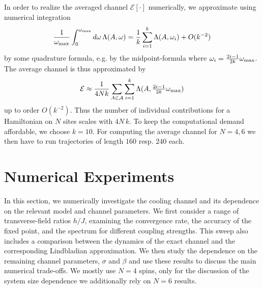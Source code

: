 \documentclass[12pt,a4paper]{article}
\begin{document}
In order to realize the averaged channel $\mathcal{E}[\cdot]$ numerically, we approximate using numerical integration
\begin{align}\label{eq:avg_channel_quadrature} \frac{1}{\omega_{\rm max}}
    \int_0^{\omega_{\rm max}} d\omega\, \Lambda(A,\omega) = \frac{1}{k}\sum_{i=1}^k \Lambda(A,\omega_i) + O(k^{-2})
\end{align} by some quadrature formula, e.g. by the midpoint-formula where $\omega_i = \frac{2i-1}{2k}\omega_{\rm max}$. The average channel is thus approximated by
\begin{align}\label{eq:avg_channel_approx}
\mathcal{E} \approx
\frac{1}{4N  k }\sum_{A\in\mathcal A} \sum_{i=1}^k \Lambda(A, \tfrac{2i-1}{2k}\omega_{\rm max}) 
\end{align}
up to order $O(k^{-2})$. Thus the number of individual contributions for a Hamiltonian on $N$ sites scales with $4N\,k$. To keep the computational demand affordable, we choose $k = 10$. For computing the average channel for $N=4,6$ we then have to run trajectories of length $160$ resp. $240$ each. 

%

\section{Numerical Experiments}

In this section, we numerically investigate the cooling channel and its dependence on the relevant model and channel parameters. We first consider a range of transverse-field ratios $h/J$, examining the convergence rate, the accuracy of the fixed point, and the spectrum for different coupling strengths. This sweep also includes a comparison between the dynamics of the exact channel and the corresponding Lindbladian approximation. We then study the dependence on the remaining channel parameters, $\sigma$ and $\beta$ and use these results to discuss the main numerical trade-offs. We mostly use $N=4$ spins, only for the discussion of the system size dependence we additionally rely on $N=6$ results. %
\end{document}
